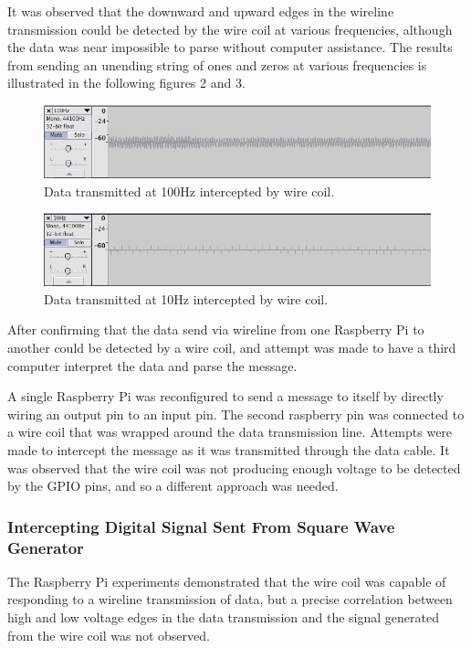 \documentclass{article}
\begin{document}
It was observed that the downward and upward edges in the wireline transmission could be detected by the wire coil at various frequencies, although the data  was near impossible to parse without computer assistance. The results from sending an unending string of ones and zeros at various frequencies is illustrated in the following figures 2 and 3.

\begin{figure}
	\includegraphics[width=\linewidth]{images/100hz.png}
	\caption{Data transmitted at 100Hz intercepted by wire coil.}
	\label{fig:100hz}
\end{figure}

\begin{figure}
	\includegraphics[width=\linewidth]{images/10hz.png}
	\caption{Data transmitted at 10Hz intercepted by wire coil.}
	\label{fig:10hz}
\end{figure}

After confirming that the data send via wireline from one Raspberry Pi to another could be detected by a wire coil, and attempt was made to have a third computer interpret the data and parse the message.

A single Raspberry Pi was reconfigured to send a message to itself by directly wiring an output pin to an input pin. The second raspberry pin was connected to a wire coil that was wrapped around the data transmission line. Attempts were made to intercept the message as it was transmitted through the data cable. It was observed that the wire coil was not producing enough voltage to be detected by the GPIO pins, and so a different approach was needed.

\subsubsection{Intercepting Digital Signal Sent From Square Wave Generator}

The Raspberry Pi experiments demonstrated that the wire coil was capable of responding to a wireline transmission of data, but a precise correlation between high and low voltage edges in the data transmission and the signal generated from the wire coil was not observed.
\end{document}

